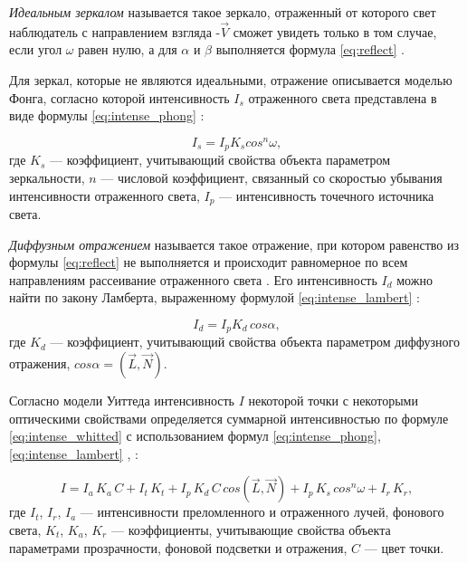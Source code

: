 \textit{Идеальным зеркалом} называется такое зеркало, отраженный от которого свет наблюдатель с направлением взгляда -$\overrightarrow V$ сможет увидеть только в том случае, если угол $\omega$ равен нулю, а для $\alpha$ и $\beta$ выполняется формула \ref{eq:reflect} \cite{порев2002компьютерная}.

Для зеркал, которые не являются идеальными, отражение описывается моделью Фонга, согласно которой интенсивность $I_s$ отраженного света представлена в виде формулы \ref{eq:intense_phong} \cite{порев2002компьютерная}:

\begin{equation}\label{eq:intense_phong}
	I_s=I_p K_s cos^n{\omega},
\end{equation}
где $K_s$ --- коэффициент, учитывающий свойства объекта параметром зеркальности, $n$ --- числовой коэффициент, связанный со скоростью убывания интенсивности отраженного света, $I_p$ --- интенсивность точечного источника света.

\textit{Диффузным отражением} называется такое отражение, при котором равенство из формулы \ref{eq:reflect} не выполняется и происходит равномерное по всем направлениям рассеивание отраженного света \cite{порев2002компьютерная}.
Его интенсивность $I_d$ можно найти по закону Ламберта, выраженному формулой \ref{eq:intense_lambert} \cite{порев2002компьютерная}:

\begin{equation}\label{eq:intense_lambert}
	I_d=I_p K_d \, cos{\alpha},
\end{equation}
где $K_d$ --- коэффициент, учитывающий свойства объекта параметром диффузного отражения, $cos{\alpha} = (\overrightarrow L, \overrightarrow N)$.

Согласно модели Уиттеда интенсивность $I$ некоторой точки  с некоторыми оптическими свойствами определяется суммарной интенсивностью по формуле \ref{eq:intense_whitted} с использованием формул \ref{eq:intense_phong}, \ref{eq:intense_lambert} \cite{порев2002компьютерная}, \cite{боресков}:

\begin{equation}\label{eq:intense_whitted}
	I = I_a \, K_a \, C + I_t \, K_t + I_p \, K_d \, C \, cos(\overrightarrow L, \overrightarrow N) + I_p \, K_s \, cos^n{\omega} + I_r \, K_r,
\end{equation}
где $I_t$, $I_r$, $I_a$ --- интенсивности преломленного и отраженного лучей, фонового света, $K_t$, $K_a$, $K_r$ --- коэффициенты, учитывающие свойства объекта параметрами прозрачности, фоновой подсветки и отражения, $C$ --- цвет точки.

